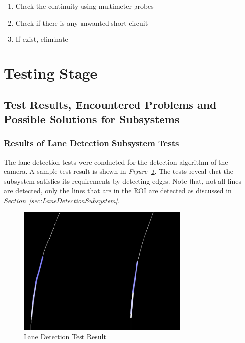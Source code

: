 \documentclass[a4paper,12pt]{article}
\begin{document}
\begin{enumerate}
\begin{enumerate}
\begin{enumerate}
\item Check the continuity using multimeter probes

\item Check if there is any unwanted short circuit

\item If exist, eliminate

\end{enumerate}

\end{enumerate}




\end{enumerate}




\section{Testing Stage}


\subsection{Test Results, Encountered Problems and Possible Solutions for Subsystems}	


\subsubsection*{Results of Lane Detection Subsystem Tests}


The lane detection tests were conducted for the detection algorithm of the camera. A sample test result is shown in \textit{Figure~\ref{fig:laneD_test}}. The tests reveal that the subsystem satisfies its requirements by detecting edges. Note that, not all lines are detected, only the lines that are in the ROI are detected as discussed in \textit{Section~\ref{sec:LaneDetectionSubsystem}}.


\begin{figure}[h]

\includegraphics[width=0.75\textwidth,center]{images/laneD_test}

\caption{Lane Detection Test Result \label{fig:laneD_test} }

\end{figure}
\end{document}
